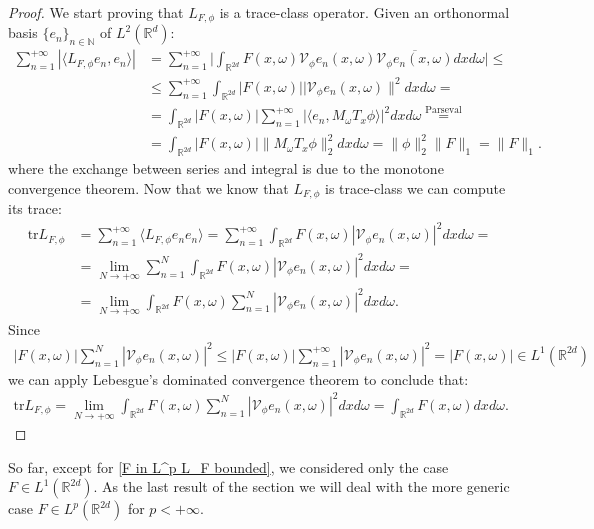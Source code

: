 \documentclass[corpo=11pt, stile=classica, tipotesi=custom,
greek, evenboxes, english]{toptesi}
\numberwithin{equation}{chapter}
\theoremstyle{remark}
\newcommand{\R}{\mathbb{R}} %
\newcommand{\N}{\mathbb{N}} %
\newcommand{\V}{\mathcal{V}} %
\begin{document}
\begin{proof}
	We start proving that $L_{F,\phi}$ is a trace-class operator. Given an orthonormal basis $\{e_n\}_{n \in \N}$ of $L^2(\R^d)$:
	\begin{align*}
		\sum_{n=1}^{+\infty} |\langle L_{F,\phi} e_n, e_n \rangle| &= \sum_{n=1}^{+\infty} \Big| \int_{\R^{2d}} F(x,\omega) \V_{\phi}e_n(x,\omega) \overline{\V_{\phi} e_n(x,\omega)} dx d\omega \Big| \leq \\
																   &\leq \sum_{n=1}^{+\infty} \int_{\R^{2d}} |F(x,\omega)| |\V_{\phi} e_n(x,\omega)\|^2 dxd\omega =\\
																   &= \int_{\R^{2d}} |F(x,\omega)| \sum_{n=1}^{+\infty} |\langle e_n, M_{\omega}T_x \phi \rangle|^2 dx d\omega \overset{\mathrm{Parseval}}{=}\\
																   &= \int_{\R^{2d}} |F(x,\omega)| \|M_{\omega} T_x \phi\|_2^2 dx d\omega = \|\phi\|_2^2 \|F\|_1 = \|F\|_1.
	\end{align*}
	where the exchange between series and integral is due to the monotone convergence theorem. Now that we know that $L_{F,\phi}$ is trace-class we can compute its trace:
	\begin{align*}
		\mathrm{tr}L_{F,\phi} &= \sum_{n=1}^{+\infty} \langle L_{F,\phi}e_n e_n \rangle = \sum_{n=1}^{+\infty}  \int_{\R^{2d}} F(x,\omega) |\V_{\phi}e_n(x,\omega)|^2 dx d\omega=\\
							  &= \lim_{N \rightarrow +\infty} \sum_{n=1}^{N} \int_{\R^{2d}} F(x,\omega) |\V_{\phi}e_n(x,\omega)|^2 dx d\omega =\\
							  &= \lim_{N \rightarrow +\infty} \int_{\R^{2d}} F(x,\omega) \sum_{n=1}^{N} |\V_{\phi}e_n(x,\omega)|^2 dx d\omega.
	\end{align*}
	Since
	\begin{align*}
		|F(x,\omega)| \sum_{n=1}^{N} |\V_{\phi}e_n(x,\omega)|^2 \leq |F(x,\omega)| \sum_{n=1}^{+\infty} |\V_{\phi}e_n(x,\omega)|^2 = |F(x,\omega)| \in L^1(\R^{2d})
	\end{align*}
	we can apply Lebesgue's dominated convergence theorem to conclude that: 
	\begin{align*}
		\mathrm{tr}L_{F,\phi} = \lim_{N \rightarrow +\infty} \int_{\R^{2d}} F(x,\omega) \sum_{n=1}^{N} |\V_{\phi}e_n(x,\omega)|^2 dx d\omega = \int_{\R^{2d}} F(x,\omega) dx d\omega.
	\end{align*}
\end{proof}
So far, except for \ref{F in L^p L_F bounded}, we considered only the case $F \in L^1(\R^{2d})$. As the last result of the section we will deal with the more generic case $F \in L^p(\R^{2d})$ for $p < +\infty$.
\end{document}
